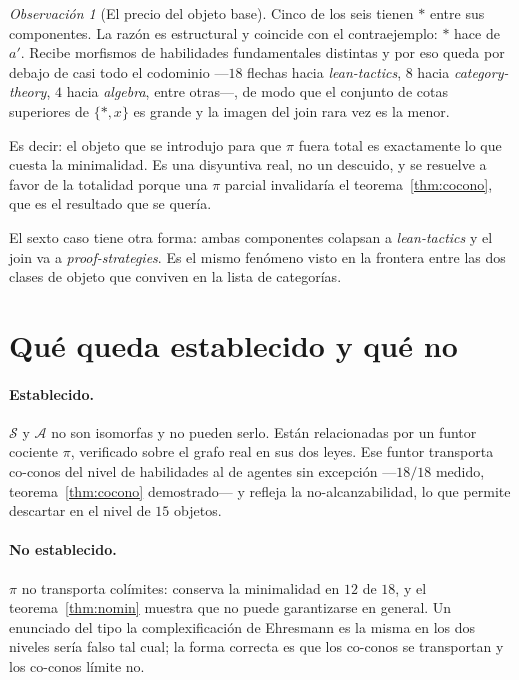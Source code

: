 \documentclass[11pt,a4paper]{article}
\theoremstyle{plain}
\theoremstyle{definition}
\theoremstyle{remark}
\newtheorem{observacion}[teorema]{Observación}
\newcommand{\Skills}{\mathcal{S}}
\newcommand{\Agentes}{\mathcal{A}}
\newcommand{\base}{\ast}
\begin{document}
\begin{observacion}[El precio del objeto base]
Cinco de los seis tienen $\base$ entre sus componentes. La razón es
estructural y coincide con el contraejemplo: $\base$ hace de $a'$. Recibe
morfismos de habilidades fundamentales distintas y por eso queda por debajo de
casi todo el codominio —$18$ flechas hacia \textit{lean-tactics}, $8$ hacia
\textit{category-theory}, $4$ hacia \textit{algebra}, entre otras—, de modo que
el conjunto de cotas superiores de $\{\base, x\}$ es grande y la imagen del join
rara vez es la menor.

Es decir: el objeto que se introdujo para que $\pi$ fuera total es exactamente
lo que cuesta la minimalidad. Es una disyuntiva real, no un descuido, y se
resuelve a favor de la totalidad porque una $\pi$ parcial invalidaría el
teorema~\ref{thm:cocono}, que es el resultado que se quería.
\end{observacion}

El sexto caso tiene otra forma: ambas componentes colapsan a
\textit{lean-tactics} y el join va a \textit{proof-strategies}. Es el mismo
fenómeno visto en la frontera entre las dos clases de objeto que conviven en la
lista de categorías.

\section{Qué queda establecido y qué no}

\paragraph{Establecido.}
$\Skills$ y $\Agentes$ no son isomorfas y no pueden serlo. Están relacionadas
por un funtor cociente $\pi$, verificado sobre el grafo real en sus dos leyes.
Ese funtor transporta co-conos del nivel de habilidades al de agentes sin
excepción —$18/18$ medido, teorema~\ref{thm:cocono} demostrado— y refleja la
no-alcanzabilidad, lo que permite descartar en el nivel de $15$ objetos.

\paragraph{No establecido.}
$\pi$ no transporta colímites: conserva la minimalidad en $12$ de $18$, y el
teorema~\ref{thm:nomin} muestra que no puede garantizarse en general. Un
enunciado del tipo \guillemotleft{}la complexificación de Ehresmann es la misma en los dos
niveles\guillemotright{} sería falso tal cual; la forma correcta es que los co-conos se
transportan y los co-conos límite no.
\end{document}

